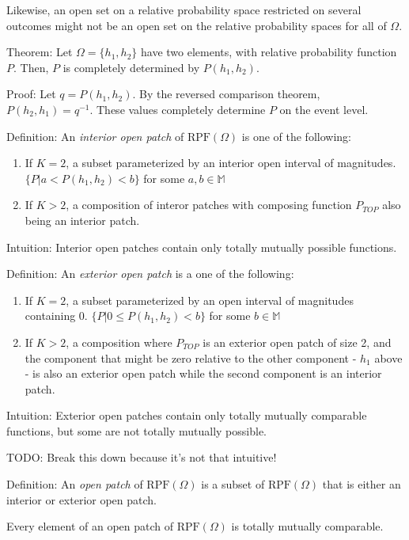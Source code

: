 \documentclass[twoside]{article}
\begin{document}
Likewise, an open set on a relative probability space restricted on several outcomes might not be an open set on the relative probability spaces for all of \(\Omega\).

Theorem: Let \(\Omega = \{h_1, h_2\}\) have two elements, with relative probability function \(P\). Then, \(P\) is completely determined by \(P(h_1, h_2)\).

Proof: Let \(q = P(h_1, h_2)\). By the reversed comparison theorem, \(P(h_2, h_1) = q^{-1}\). These values completely determine \(P\) on the event level.

Definition: An \textit{interior open patch} of \(\text{RPF}(\Omega)\) is one of the following:

\begin{enumerate}
  \item If \(K = 2\), a subset parameterized by an interior open interval of magnitudes. \(\{P | a < P(h_1, h_2) < b\}\) for some \(a, b \in \mathbb{M}\) 
  \item If \(K > 2\), a composition of interor patches with composing function \(P_{TOP}\) also being an interior patch.
\end{enumerate}

Intuition: Interior open patches contain only totally mutually possible functions.

Definition: An \textit{exterior open patch} is a one of the following:

\begin{enumerate}
  \item If \(K = 2\), a subset parameterized by an open interval of magnitudes containing 0. \(\{P | 0 \leq P(h_1, h_2) < b\}\) for some \(b \in \mathbb{M}\) 
  \item If \(K > 2\), a composition where \(P_{TOP}\) is an exterior open patch of size 2, and the component that might be zero relative to the other component - \(h_1\) above - is also an exterior open patch while the second component is an interior patch.
\end{enumerate}

Intuition: Exterior open patches contain only totally mutually comparable functions, but some are not totally mutually possible.

TODO: Break this down because it's not that intuitive!

Definition: An \textit{open patch} of \(\text{RPF}(\Omega)\) is a subset of \(\text{RPF}(\Omega)\) that is either an interior or exterior open patch.

Every element of an open patch of \(\text{RPF}(\Omega)\) is totally mutually comparable.
\end{document}
